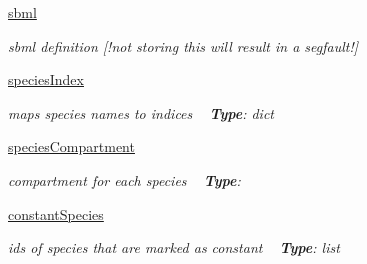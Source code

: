 \begin{DoxyCompactItemize}
\mbox{\label{classamici_1_1sbml__import_1_1_sbml_importer_ac1e9dd522f751032fb0142ef8a78c3f4}} 
\mbox{\hyperlink{classamici_1_1sbml__import_1_1_sbml_importer_ac1e9dd522f751032fb0142ef8a78c3f4}{sbml}}
\begin{DoxyCompactList}\small\item\em sbml definition \mbox{[}!not storing this will result in a segfault!\mbox{]} \end{DoxyCompactList}\item 
\mbox{\label{classamici_1_1sbml__import_1_1_sbml_importer_a88d39dffecd3ff40fea335bc82fdee06}} 
\mbox{\hyperlink{classamici_1_1sbml__import_1_1_sbml_importer_a88d39dffecd3ff40fea335bc82fdee06}{species\+Index}}
\begin{DoxyCompactList}\small\item\em maps species names to indices ~\newline
{\bfseries{Type}}\+: dict \end{DoxyCompactList}\item 
\mbox{\label{classamici_1_1sbml__import_1_1_sbml_importer_aeebf394715386e2d46b381aec705e7cd}} 
\mbox{\hyperlink{classamici_1_1sbml__import_1_1_sbml_importer_aeebf394715386e2d46b381aec705e7cd}{species\+Compartment}}
\begin{DoxyCompactList}\small\item\em compartment for each species ~\newline
{\bfseries{Type}}\+: \end{DoxyCompactList}\item 
\mbox{\label{classamici_1_1sbml__import_1_1_sbml_importer_a64859da7ab190d44c8d03e004e5712fc}} 
\mbox{\hyperlink{classamici_1_1sbml__import_1_1_sbml_importer_a64859da7ab190d44c8d03e004e5712fc}{constant\+Species}}
\begin{DoxyCompactList}\small\item\em ids of species that are marked as constant ~\newline
{\bfseries{Type}}\+: list \end{DoxyCompactList}\item 
\mbox{\label{classamici_1_1sbml__import_1_1_sbml_importer_ac58d33fa62dff054a1f5b77f62b90d51}} 

\end{DoxyCompactItemize}
